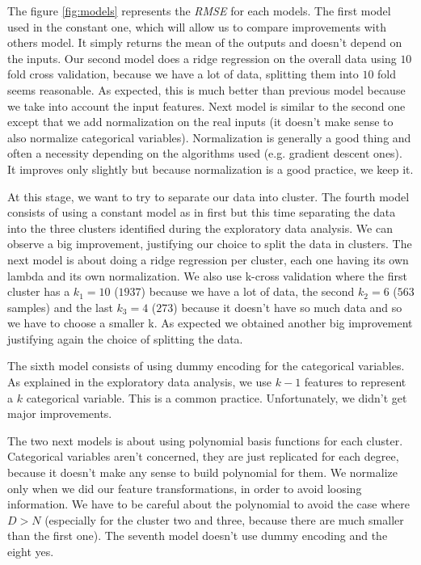 \documentclass{article} %
\begin{document}
The figure \ref{fig:models} represents the \textit{RMSE} for each models. The first model used in the constant one, which will allow us to compare improvements with others model. It simply returns the mean of the outputs and doesn't depend on the inputs. Our second model does a ridge regression on the overall data using $10$ fold cross validation, because we have a lot of data, splitting them into $10$ fold seems reasonable. As expected, this is much better than previous model because we take into account the input features. Next model is similar to the second one except that we add normalization on the real inputs (it doesn't make sense to also normalize categorical variables). Normalization is generally a good thing and often a necessity depending on the algorithms used (e.g. gradient descent ones). It improves only slightly but because normalization is a good practice, we keep it.

At this stage, we want to try to separate our data into cluster. The fourth model consists of using a constant model as in first but this time separating the data into the three clusters identified during the exploratory data analysis. We can observe a big improvement, justifying our choice to split the data in clusters. The next model is about doing a ridge regression per cluster, each one having its own lambda and its own normalization. We also use k-cross validation where the first cluster has a $k_1=10$ ($1937$) because we have a lot of data, the second $k_2=6$ ($563$ samples) and the last $k_3=4$ ($273$) because it doesn't have so much data and so we have to choose a smaller k. As expected we obtained another big improvement justifying again the choice of splitting the data.

The sixth model consists of using dummy encoding for the categorical variables. As explained in the exploratory data analysis, we use $k-1$ features to represent a $k$ categorical variable. This is a common practice. Unfortunately, we didn't get major improvements.

The two next models is about using polynomial basis functions for each cluster. Categorical variables aren't concerned, they are just replicated for each degree, because it doesn't make any sense to build polynomial for them. We normalize only when we did our feature transformations, in order to avoid loosing information. We have to be careful about the polynomial to avoid the case where $D > N$ (especially for the cluster two and three, because there are much smaller than the first one). The seventh model doesn't use dummy encoding and the eight yes.
\end{document}
